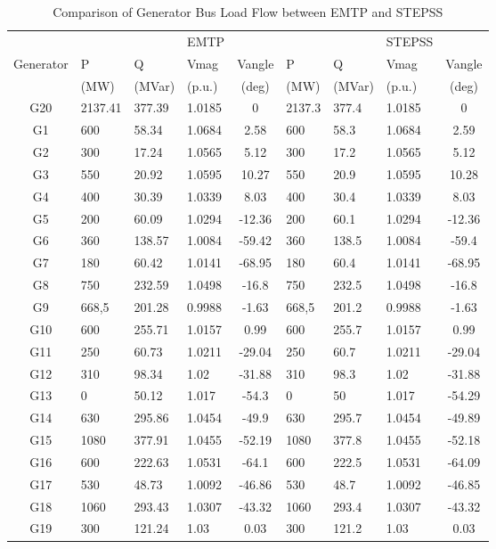 \documentclass{report}
\begin{document}
\begin{table}
\centering
\caption{Comparison of Generator Bus Load Flow between EMTP and STEPSS}
\begin{tabular}{c| l l l c| l l l c| } 
 & &  & EMTP &  & &  & STEPSS &  \\ 
Generator & P  & Q & Vmag  & Vangle  & P & Q & Vmag & Vangle \\ 
& (MW) & (MVar) &  (p.u.) & (deg) & (MW) & (MVar) &  (p.u.) & (deg)\\
\hline
G20 & 2137.41 & 377.39 & 1.0185 & 0 & 2137.3 & 377.4 & 1.0185 & 0 \\ 
G1 & 600 & 58.34 & 1.0684 & 2.58 & 600 & 58.3 & 1.0684 & 2.59 \\ 
G2 & 300 & 17.24 & 1.0565 & 5.12 & 300 & 17.2 & 1.0565 & 5.12 \\ 
G3 & 550 & 20.92 & 1.0595 & 10.27 & 550 & 20.9 & 1.0595 & 10.28 \\ 
G4 & 400 & 30.39 & 1.0339 & 8.03 & 400 & 30.4 & 1.0339 & 8.03 \\ 
G5 & 200 & 60.09 & 1.0294 & -12.36 & 200 & 60.1 & 1.0294 & -12.36 \\ 
G6 & 360 & 138.57 & 1.0084 & -59.42 & 360 & 138.5 & 1.0084 & -59.4 \\ 
G7 & 180 & 60.42 & 1.0141 & -68.95 & 180 & 60.4 & 1.0141 & -68.95 \\ 
G8 & 750 & 232.59 & 1.0498 & -16.8 & 750 & 232.5 & 1.0498 & -16.8 \\ 
G9 & 668,5 & 201.28 & 0.9988 & -1.63 & 668,5 & 201.2 & 0.9988 & -1.63 \\ 
G10 & 600 & 255.71 & 1.0157 & 0.99 & 600 & 255.7 & 1.0157 & 0.99 \\ 
G11 & 250 & 60.73 & 1.0211 & -29.04 & 250 & 60.7 & 1.0211 & -29.04 \\ 
G12 & 310 & 98.34 & 1.02 & -31.88 & 310 & 98.3 & 1.02 & -31.88 \\ 
G13 & 0 & 50.12 & 1.017 & -54.3 & 0 & 50 & 1.017 & -54.29 \\ 
G14 & 630 & 295.86 & 1.0454 & -49.9 & 630 & 295.7 & 1.0454 & -49.89 \\ 
G15 & 1080 & 377.91 & 1.0455 & -52.19 & 1080 & 377.8 & 1.0455 & -52.18 \\ 
G16 & 600 & 222.63 & 1.0531 & -64.1 & 600 & 222.5 & 1.0531 & -64.09 \\ 
G17 & 530 & 48.73 & 1.0092 & -46.86 & 530 & 48.7 & 1.0092 & -46.85 \\ 
G18 & 1060 & 293.43 & 1.0307 & -43.32 & 1060 & 293.4 & 1.0307 & -43.32 \\ 
G19 & 300 & 121.24 & 1.03 & 0.03 & 300 & 121.2 & 1.03 & 0.03 \\ 

\end{tabular}
\label{Generator}
\end{table}
\end{document}
